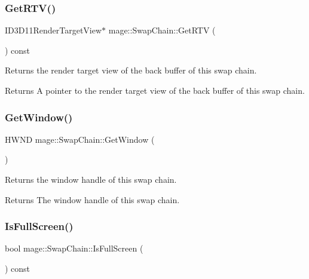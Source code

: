 \subsubsection{\texorpdfstring{Get\+R\+T\+V()}{GetRTV()}}
{\footnotesize\ttfamily I\+D3\+D11\+Render\+Target\+View$\ast$ mage\+::\+Swap\+Chain\+::\+Get\+R\+TV (\begin{DoxyParamCaption}{ }\end{DoxyParamCaption}) const\hspace{0.3cm}{\ttfamily [noexcept]}}

Returns the render target view of the back buffer of this swap chain.

\begin{DoxyReturn}{Returns}
A pointer to the render target view of the back buffer of this swap chain. 
\end{DoxyReturn}
\hypertarget{classmage_1_1_swap_chain_a4e7e21747db8638646b46690a23ea76f}{}\label{classmage_1_1_swap_chain_a4e7e21747db8638646b46690a23ea76f} 
\subsubsection{\texorpdfstring{Get\+Window()}{GetWindow()}}
{\footnotesize\ttfamily H\+W\+ND mage\+::\+Swap\+Chain\+::\+Get\+Window (\begin{DoxyParamCaption}{ }\end{DoxyParamCaption})\hspace{0.3cm}{\ttfamily [noexcept]}}

Returns the window handle of this swap chain.

\begin{DoxyReturn}{Returns}
The window handle of this swap chain. 
\end{DoxyReturn}
\hypertarget{classmage_1_1_swap_chain_a85873ca586fbcd83c237692a011d6d08}{}\label{classmage_1_1_swap_chain_a85873ca586fbcd83c237692a011d6d08} 
\subsubsection{\texorpdfstring{Is\+Full\+Screen()}{IsFullScreen()}}
{\footnotesize\ttfamily bool mage\+::\+Swap\+Chain\+::\+Is\+Full\+Screen (\begin{DoxyParamCaption}{ }\end{DoxyParamCaption}) const\hspace{0.3cm}{\ttfamily [noexcept]}}

